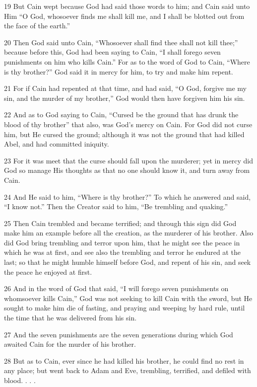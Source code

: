 \par 19 But Cain wept because God had said those words to him; and Cain said unto Him “O God, whosoever finds me shall kill me, and I shall be blotted out from the face of the earth.”

\par 20 Then God said unto Cain, “Whosoever shall find thee shall not kill thee;” because before this, God had been saying to Cain, “I shall forego seven punishments on him who kills Cain.” For as to the word of God to Cain, “Where is thy brother?” God said it in mercy for him, to try and make him repent.

\par 21 For if Cain had repented at that time, and had said, “O God, forgive me my sin, and the murder of my brother,” God would then have forgiven him his sin.

\par 22 And as to God saying to Cain, “Cursed be the ground that has drunk the blood of thy brother” that also, was God's mercy on Cain. For God did not curse him, but He cursed the ground; although it was not the ground that had killed Abel, and had committed iniquity.

\par 23 For it was meet that the curse should fall upon the murderer; yet in mercy did God so manage His thoughts as that no one should know it, and turn away from Cain.

\par 24 And He said to him, “Where is thy brother?” To which he answered and said, “I know not.” Then the Creator said to him, “Be trembling and quaking.”

\par 25 Then Cain trembled and became terrified; and through this sign did God make him an example before all the creation, as the murderer of his brother. Also did God bring trembling and terror upon him, that he might see the peace in which he was at first, and see also the trembling and terror he endured at the last; so that he might humble himself before God, and repent of his sin, and seek the peace he enjoyed at first.

\par 26 And in the word of God that said, “I will forego seven punishments on whomsoever kills Cain,” God was not seeking to kill Cain with the sword, but He sought to make him die of fasting, and praying and weeping by hard rule, until the time that he was delivered from his sin.

\par 27 And the seven punishments are the seven generations during which God awaited Cain for the murder of his brother.

\par 28 But as to Cain, ever since he had killed his brother, he could find no rest in any place; but went back to Adam and Eve, trembling, terrified, and defiled with blood. . . .


